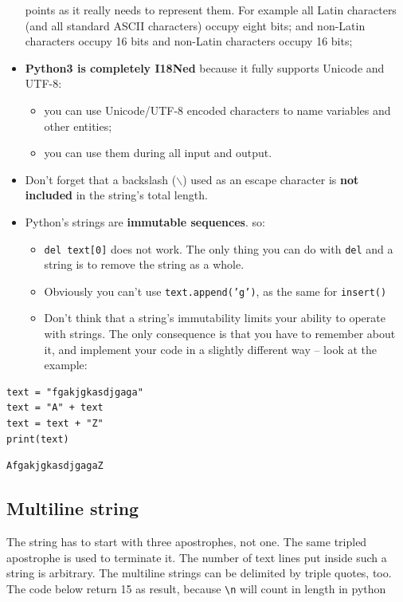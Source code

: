 \documentclass[11pt]{article}
\begin{document}
\begin{itemize}
points as it really needs to represent them. For example all Latin
characters (and all standard ASCII characters) occupy eight bits;
and non-Latin characters occupy 16 bits and non-Latin characters
occupy 16 bits;
\item \textbf{Python3 is completely I18Ned} because it fully supports Unicode and
UTF-8:
\begin{itemize}
\item you can use Unicode/UTF-8 encoded characters to name variables and
other entities;
\item you can use them during all input and output.
\end{itemize}
\item Don’t forget that a backslash ($\backslash$) used as an escape character is \textbf{not included} 
in the string’s total length.
\item Python’s strings are \textbf{immutable sequences}. so:
\begin{itemize}
\item \texttt{del text[0]} does not work. The only thing you can do with \texttt{del} and a string is to remove the string as a whole.
\item Obviously you can't use \texttt{text.append('g')}, as the same for \texttt{insert()}
\item Don’t think that a string’s immutability limits your ability to
operate with strings. The only consequence is that you have to
remember about it, and implement your code in a slightly different
way – look at the example:
\end{itemize}
\end{itemize}

\begin{verbatim}
text = "fgakjgkasdjgaga"
text = "A" + text
text = text + "Z"
print(text)
\end{verbatim}

\begin{verbatim}
AfgakjgkasdjgagaZ
\end{verbatim}

\subsection{Multiline string}
\label{sec:orgce283a7}
The string has to start with three apostrophes, not one. The same
tripled apostrophe is used to terminate it. The number of text lines
put inside such a string is arbitrary. The multiline strings can be
delimited by triple quotes, too. The code below return 15 as result,
because \texttt{\textbackslash{}n} will count in length in python
\end{document}
